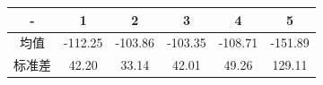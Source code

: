 \documentclass[a4paper,UTF8]{article}
\theoremstyle{definition}
\begin{document}

	\begin{tabular}{|c|c|c|c|c|c|}
	
		\hline
		
		\hline
		
		- & 1 & 2 & 3 & 4 & 5 \\
		
		\hline
		
		均值 & -112.25 & -103.86 & -103.35 & -108.71 & -151.89\\

		\hline

		标准差 & 42.20 & 33.14 & 42.01 & 49.26 & 129.11\\
		
		\hline
	
	\end{tabular}
\end{document}
